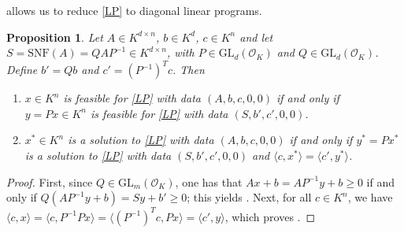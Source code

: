 \documentclass[a4paper,12pt]{article}
\newtheorem{proposition}[theorem]{Proposition}
\newcommand{\OK}{\mathcal{O}_K}
\newcommand{\GL}{\mathrm{GL}}
\begin{document}
 allows us to reduce \eqref{LP} to diagonal linear programs.

\begin{proposition} \label{solsLP}
  Let $A \in K^{d\times n}$, $b \in K^d$, $c\in K^n$ and let
  $S = \mathrm{SNF}(A) = QAP^{-1} \in K^{d\times n}$, with
  $P \in \GL_d(\OK)$ and $Q\in \GL_d(\OK)$.
  Define $b' = Qb$ and $c' = (P^{-1})^Tc$.
  Then
   \begin{enumerate}
   \item \label{solsLP_item1}
     $x \in K^n$ is feasible for \eqref{LP} with data $(A,b,c,0,0)$ if and only if $y = P x \in K^n$ is
     feasible for \eqref{LP} with data $(S,b',c',0,0)$.
   \item \label{solsLP_item2}
     $x^* \in K^n$ is a solution to \eqref{LP} with data $(A,b,c,0,0)$ if and only if $y^* = P x^*$ is
     a solution to \eqref{LP} with data $(S,b',c',0,0)$ and $\langle c,x^* \rangle = \langle c',y^* \rangle$.
   \end{enumerate}
\end{proposition}
\begin{proof}
  First, since $Q \in \GL_m(\OK)$, one has that $Ax+b = AP^{-1}y +b \geq 0$
  if and only if $Q(AP^{-1}y + b) = Sy + b' \geq 0$; this yields .
  Next, for all $c \in K^n$, we have $\langle c,
  x\rangle = \langle c, P^{-1}Px \rangle = \langle \left(P^{-1}\right)^T c, Px \rangle = \langle c',y\rangle$,
  which proves .
\end{proof}
\end{document}
